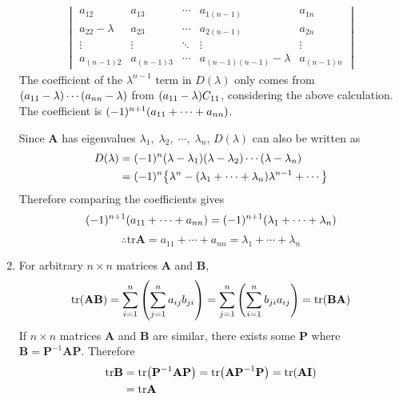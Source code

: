 \documentclass[10pt]{article}
\begin{document}
\begin{enumerate}[leftmargin=*, label={(\alph*)}]
\begin{align*}
\begin{vmatrix}
            a_{12} & a_{13} & \cdots & a_{1(n-1)} & a_{1n} \\
            a_{22} - \lambda & a_{23} & \cdots & a_{2(n-1)} & a_{2n} \\ 
            \vdots & \vdots & \ddots & \vdots & \vdots \\
            a_{(n-1)2} & a_{(n-1)3} & \cdots & a_{(n-1)(n-1)} - \lambda & a_{(n-1)n}
        \end{vmatrix}
    \end{align*}
    The coefficient of the $\lambda^{n-1}$ term in $D(\lambda)$ only comes from $\qty(a_{11}-\lambda)\cdots\qty(a_{nn}-\lambda)$ from $\qty(a_{11} - \lambda)C_{11}$, considering the above calculation. 
    The coefficient is $(-1)^{n+1}\qty(a_{11} + \cdots + a_{nn})$.

    Since $\mathbf{A}$ has eigenvalues $\lambda_1, \; \lambda_2, \; \cdots , \;\lambda_n$, $D(\lambda)$ can also be written as
    \begin{align*}
        D(\lambda) &= (-1)^n\qty(\lambda - \lambda_1)\qty(\lambda - \lambda_2)\cdots\qty(\lambda - \lambda_n) \\
        &= (-1)^n\qty{\lambda^n - \qty(\lambda_1 + \cdots + \lambda_n)\lambda^{n-1} + \cdots}
    \end{align*}
    Therefore comparing the coefficients gives
    $$(-1)^{n+1}\qty(a_{11} + \cdots + a_{nn}) = (-1)^{n+1}\qty(\lambda_1 + \cdots + \lambda_n)$$
    $$\therefore \mathrm{tr}\mathbf{A} = a_{11} + \cdots + a_{nn} = \lambda_1 + \cdots + \lambda_n$$
    \item For arbitrary $n \times n$ matrices $\mathbf{A}$ and $\mathbf{B}$, 
    $$\mathrm{tr}\qty(\mathbf{AB}) = \sum_{i=1}^{n}\qty(\sum_{j=1}^{n}a_{ij}b_{ji}) = \sum_{j=1}^{n}\qty(\sum_{i=1}^{n}b_{ji}a_{ij}) = \mathrm{tr}\qty(\mathbf{BA})$$
    If $n \times n$ matrices $\mathbf{A}$ and $\mathbf{B}$ are similar, there exists some $\mathbf{P}$ where $\mathbf{B} = \mathbf{P}^{-1}\mathbf{AP}$. Therefore 
    \begin{align*}
        \mathrm{tr}\mathbf{B} &= \mathrm{tr}\qty(\mathbf{P}^{-1}\mathbf{AP}) 
        = \mathrm{tr}\qty(\mathbf{AP}^{-1}\mathbf{P}) 
        = \mathrm{tr}\qty(\mathbf{AI}) \\
        &= \mathrm{tr}\mathbf{A}
    \end{align*}
\end{enumerate}
\end{document}
